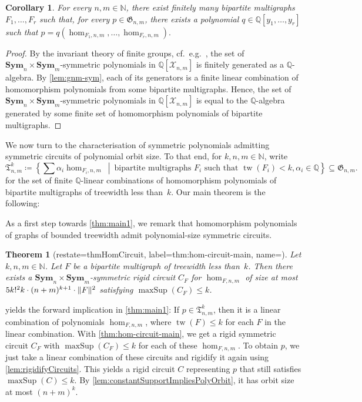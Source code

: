 \documentclass[11pt, DIV=15]{scrarticle}
\theoremstyle{definition}
\theoremstyle{plain}
\newtheorem{corollary}[definition]{Corollary}
\newtheorem{theorem}[definition]{Theorem}
\theoremstyle{remark}
\DeclarePairedDelimiter{\norm}{\lVert}{\rVert}
\DeclareMathOperator{\tw}{tw}
\newcommand{\Sym}{\mathbf{Sym}}
\DeclareMathOperator{\maxSup}{maxSup}
\begin{document}
	\begin{corollary}
		For every $n,m \in \mathbb{N}$,
		there exist finitely many bipartite multigraphs $F_1, \dots, F_r$ such that, for every $p \in \mathfrak{G}_{n,m}$,
		there exists a polynomial $q \in \mathbb{Q}[y_1, \dots, y_r]$ such that 
		\(
		p = q(\hom_{F_1, n,m}, \dots, \hom_{F_r, n,m}).
		\)
	\end{corollary}
	\begin{proof}
		By the invariant theory of finite groups, cf.\ e.g.\ \cite[Proposition~3.0.1]{derksen_computational_2015}, 
		the set of $\Sym_n \times \Sym_m$-symmetric polynomials in $\mathbb{Q}[\mathcal{X}_{n,m}]$ is finitely generated as a $\mathbb{Q}$-algebra.
		By \cref{lem:gnm-sym}, each of its generators is a finite linear combination of homomorphism polynomials from some bipartite multigraphs.
		Hence, the set of $\Sym_n \times \Sym_m$-symmetric polynomials in $\mathbb{Q}[\mathcal{X}_{n,m}]$ is equal to the $\mathbb{Q}$-algebra generated by some finite set of homomorphism polynomials of bipartite multigraphs.
	\end{proof}
	
	We now turn to the characterisation of symmetric polynomials admitting symmetric circuits of polynomial orbit size.
	To that end, for $k,n,m \in \mathbb{N}$, write
	\[
		\mathfrak{T}_{n,m}^k \coloneqq \left\{\sum \alpha_i \hom_{F_i, n,m} \ \middle|\  \text{bipartite multigraphs } F_i \text{ such that } \tw(F_i) < k, \alpha_i \in \mathbb{Q} \right\} \subseteq \mathfrak{G}_{n,m}.
	\]
	for the set of finite $\mathbb{Q}$-linear combinations of homomorphism polynomials of bipartite multigraphs of treewidth less than~$k$.
	Our main theorem is the following:

	\thmMain*
	
	As a first step towards \cref{thm:main1}, we remark that homomorphism polynomials of graphs of bounded treewidth admit polynomial-size symmetric circuits. 
	
	\begin{theorem}[restate=thmHomCircuit, label=thm:hom-circuit-main, name=]
		Let $k, n, m \in \mathbb{N}$.
		Let $F$ be a bipartite multigraph of treewidth less than~$k$.
		Then there exists a $\Sym_n \times \Sym_{m}$-symmetric rigid circuit $C_F$ for $\hom_{F,n,m}$ of size at most $5k!^2k \cdot (n+m)^{k+1} \cdot \norm{F}^2$ satisfying $\maxSup(C_F) \leq k$.
	\end{theorem}
	
	 yields the forward implication in \cref{thm:main1}: If $p \in \mathfrak{T}_{n,m}^k$, then it is a linear combination of polynomials $\hom_{F,n,m}$, where $\tw(F) \leq k$ for each $F$ in the linear combination. With \cref{thm:hom-circuit-main}, we get a rigid symmetric circuit $C_F$ with $\maxSup(C_F) \leq k$ for each of these $\hom_{F,n,m}$. To obtain $p$, we just take a linear combination of these circuits and rigidify it again using \cref{lem:rigidifyCircuits}. This yields a rigid circuit $C$ representing $p$ that still satisfies $\maxSup(C) \leq k$. By \cref{lem:constantSupportImpliesPolyOrbit}, it has orbit size at most $(n+m)^k$.  
	
\end{document}
